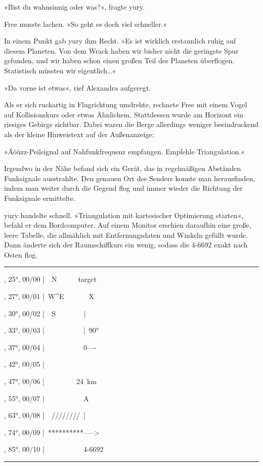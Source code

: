 »Bist du wahnsinnig oder was?«, fragte yury.

Free musste lachen. »So geht es doch viel schneller.«

In einem Punkt gab yury ihm Recht. »Es ist wirklich erstaunlich ruhig auf diesem Planeten. Von dem Wrack haben wir bisher nicht die geringste Spur gefunden, und wir haben schon einen großen Teil des Planeten überflogen. Statistisch müssten wir eigentlich…«

»Da vorne ist etwas«, rief Alexandra aufgeregt.

Als er sich ruckartig in Flugrichtung umdrehte, rechnete Free mit einem Vogel auf Kollisionskurs oder etwas Ähnlichem. Stattdessen wurde am Horizont ein riesiges Gebirge sichtbar. Dabei waren die Berge allerdings weniger beeindruckend als der kleine Hinweistext auf der Außenanzeige:

»Äöüzz-Peilsignal auf Nahfunkfrequenz empfangen. Empfehle Triangulation.«

Irgendwo in der Nähe befand sich ein Gerät, das in regelmäßigen Abständen Funksignale ausstrahlte. Den genauen Ort des Senders konnte man herausfinden, indem man weiter durch die Gegend flog und immer wieder die Richtung der Funksignale ermittelte.

yury handelte schnell. »Triangulation mit kartesischer Optimierung starten«, befahl er dem Bordcomputer. Auf einem Monitor erschien daraufhin eine große, leere Tabelle, die allmählich mit Entfernungsdaten und Winkeln gefüllt wurde. Dann änderte sich der Raumschiffkurs ein wenig, sodass die 4-6692 exakt nach Osten flog.

\noindent \parbox{\textwidth}{ \vspace{3ex} \hrule \vspace{3ex}

    \begin{footnotesize}
    \begin{ttfamily}

, 25°, 00/00  |~~N~~~~~~target~~

, 27°, 00/01  |~W\^{}E~~~~~~~X~~~~~

, 30°, 00/02  |~~S~~~~~~~~|~~~~~

, 33°, 00/03  |~~~~~~~~~~~|~90°~

, 37°, 00/04  |~~~~~~~~~~~0----~

, 42°, 00/05  |~~~~~~~~~~~~~~~~~

, 47°, 00/06  |~~~~~~~~~24~km~~~

, 55°, 00/07  |~~~~~~~~~~~A~~~~~

, 63°, 00/08  |~~////////~|~~~~~

, 74°, 00/09  |~**********----->

, 85°, 00/10  |~~~~~~~~~~~4-6692

    \end{ttfamily}
    \end{footnotesize}

\vspace{3ex} \hrule \vspace{3ex} }


